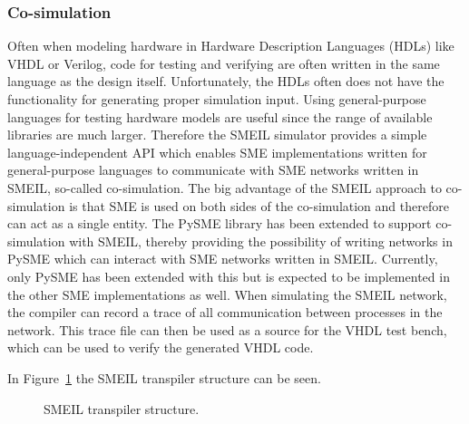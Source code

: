 \subsubsection{Co-simulation}
Often when modeling hardware in Hardware Description Languages (HDLs) like VHDL or Verilog, code for testing and verifying are often written in the same language as the design itself. Unfortunately, the HDLs often does not have the functionality for generating proper simulation input. Using general-purpose languages for testing hardware models are useful since the range of available libraries are much larger.
Therefore the SMEIL simulator provides a simple language-independent API which enables SME implementations written for general-purpose languages to communicate with SME networks written in SMEIL, so-called co-simulation.
The big advantage of the SMEIL approach to co-simulation is that SME is used on both sides of the co-simulation and therefore can act as a single entity.
The PySME %
library has been extended to support co-simulation with SMEIL, thereby providing the possibility of writing networks in PySME which can interact with SME networks written in SMEIL. Currently, only PySME has been extended with this but is expected to be implemented in the other SME implementations as well.
When simulating the SMEIL network, the compiler can record a trace of all communication between processes in the network. This trace file can then be used as a source for the VHDL test bench, which can be used to verify the generated VHDL code.

In Figure~\ref{fig:smeil_transpiler} the SMEIL transpiler structure can be seen.

\begin{figure}[!ht]
  \centering
  \caption{SMEIL transpiler structure.}
  \label{fig:smeil_transpiler}
\end{figure}
